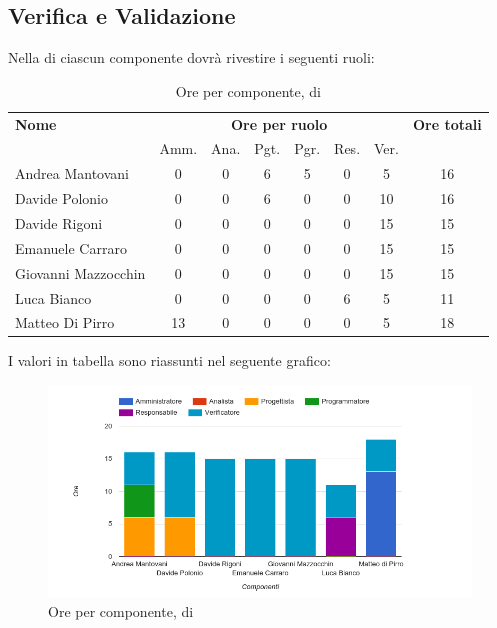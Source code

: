     
    
\pagebreak
\subsection{Verifica e Validazione}
Nella  di  ciascun componente dovrà rivestire i seguenti ruoli:

\begin{table}[H]
\begin{tabular}{lccccccc}
\toprule
    \textbf{Nome}  & \multicolumn{6}{c}{\textbf{Ore per ruolo}} & \textbf{Ore totali} \\
     & Amm. & Ana. & Pgt. & Pgr. & Res. & Ver. & \\
    \midrule
    
	   Andrea Mantovani & 0 & 0 & 6 & 5 & 0 & 5 & 16 \\
	     Davide Polonio & 0 & 0 & 6 & 0 & 0 & 10 & 16 \\
	      Davide Rigoni & 0 & 0 & 0 & 0 & 0 & 15 & 15 \\
	   Emanuele Carraro & 0 & 0 & 0 & 0 & 0 & 15 & 15 \\
	Giovanni Mazzocchin & 0 & 0 & 0 & 0 & 0 & 15 & 15 \\
	        Luca Bianco & 0 & 0 & 0 & 0 & 6 & 5 & 11 \\
	    Matteo Di Pirro & 13 & 0 & 0 & 0 & 0 & 5 & 18 \\
    
    \bottomrule
\end{tabular}
\caption{Ore per componente,  di }
\end{table}

I valori in tabella sono riassunti nel seguente grafico: \\ 

    \begin{figure}[H]
      \begin{center}
        \includegraphics[width=15cm]{res/img/suddivisioneRuoloProspettoOrario/orePerComponenteValidazione.png}
      \caption{Ore per componente,  di }
      \end{center} 
    \end{figure}    
   
